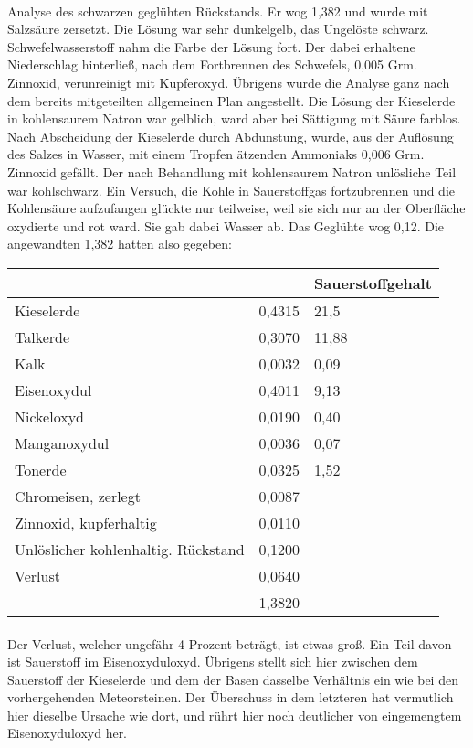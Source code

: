 \documentclass[a4paper, 11pt, oneside]{article}
\begin{document}
\paragraph{}
Analyse des schwarzen geglühten Rückstands. Er wog 1,382 und wurde mit Salzsäure zersetzt. Die Lösung war sehr dunkelgelb, das Ungelöste schwarz. Schwefelwasserstoff nahm die Farbe der Lösung fort. Der dabei erhaltene Niederschlag hinterließ, nach dem Fortbrennen des Schwefels, 0,005 Grm. Zinnoxid, verunreinigt mit Kupferoxyd. Übrigens wurde die Analyse ganz nach dem bereits mitgeteilten allgemeinen Plan angestellt. Die Lösung der Kieselerde in kohlensaurem Natron war gelblich, ward aber bei Sättigung mit Säure farblos. Nach Abscheidung der Kieselerde durch Abdunstung, wurde, aus der Auflösung des Salzes in Wasser, mit einem Tropfen ätzenden Ammoniaks 0,006 Grm. Zinnoxid gefällt. Der nach Behandlung mit kohlensaurem Natron unlösliche Teil war kohlschwarz. Ein Versuch, die Kohle in Sauerstoffgas fortzubrennen und die Kohlensäure aufzufangen glückte nur teilweise, weil sie sich nur an der Oberfläche oxydierte und rot ward. Sie gab dabei Wasser ab. Das Geglühte wog 0,12. Die angewandten 1,382 hatten also gegeben:
\begin{center}
\begin{tabular}{ |p{35mm}|p{20mm}|p{24mm}| }
    \hline
     &  & Sauerstoffgehalt\\\hline
    Kieselerde & 0,4315 & 21,5\\\hline
    Talkerde & 0,3070 & 11,88\\\hline
    Kalk & 0,0032 & 0,09\\\hline
    Eisenoxydul & 0,4011 & 9,13\\\hline
    Nickeloxyd & 0,0190 & 0,40\\\hline
    Manganoxydul & 0,0036 & 0,07\\\hline
    Tonerde & 0,0325 & 1,52\\\hline
    Chromeisen, zerlegt & 0,0087 & \\\hline
    Zinnoxid, kupferhaltig & 0,0110 & \\\hline
    Unlöslicher kohlenhaltig. Rückstand & 0,1200 & \\\hline
    Verlust & 0,0640 & \\\hline
     & 1,3820 & \\
    \hline
\end{tabular}
\end{center}
\paragraph{}
Der Verlust, welcher ungefähr 4 Prozent beträgt, ist etwas groß. Ein Teil davon ist Sauerstoff im Eisenoxyduloxyd. Übrigens stellt sich hier zwischen dem Sauerstoff der Kieselerde und dem der Basen dasselbe Verhältnis ein wie bei den vorhergehenden Meteorsteinen. Der Überschuss in dem letzteren hat vermutlich hier dieselbe Ursache wie dort, und rührt hier noch deutlicher von eingemengtem Eisenoxyduloxyd her.
\end{document}
